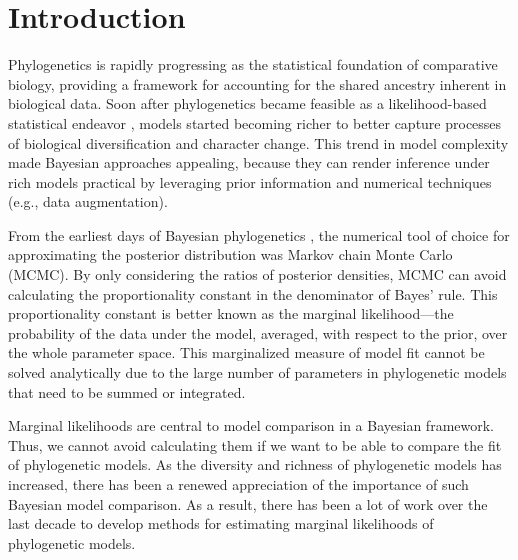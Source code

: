 \section{Introduction}

Phylogenetics is rapidly progressing as the statistical foundation of
comparative biology, providing a framework for accounting for the shared
ancestry inherent in biological data.
Soon after phylogenetics became feasible as a likelihood-based statistical
endeavor \citep{Felsenstein1981}, models started becoming richer to better
capture processes of biological diversification and character change.
This trend in model complexity made Bayesian approaches appealing, because they
can render inference under rich models practical by leveraging prior
information and numerical techniques (e.g., data augmentation).

From the earliest days of Bayesian phylogenetics \citep{Rannala1996,Mau1997},
the numerical tool of choice for approximating the posterior distribution was
Markov chain Monte Carlo (MCMC).
By only considering the ratios of posterior densities, MCMC can avoid
calculating the proportionality constant in the denominator of Bayes' rule.
This proportionality constant is better known as the marginal likelihood---the
probability of the data under the model, averaged, with respect to the prior,
over the whole parameter space.
This marginalized measure of model fit cannot be solved analytically due to
the large number of parameters in phylogenetic models that need to be summed or
integrated.

Marginal likelihoods are central to model comparison in a Bayesian framework.
Thus, we cannot avoid calculating them if we want to be able to compare the fit
of phylogenetic models.
As the diversity and richness of phylogenetic models has increased, there has
been a renewed appreciation of the importance of such Bayesian model
comparison.
As a result, there has been a lot of work over the last decade to develop
methods for estimating marginal likelihoods of phylogenetic models.

